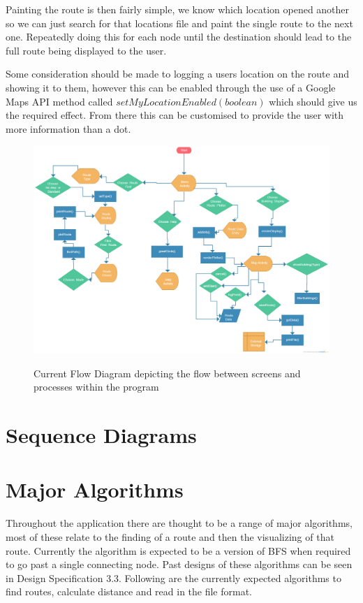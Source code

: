 Painting the route is then fairly simple, we know which location opened another so we can just search for that locations file and paint the single route to the next one. Repeatedly doing this for each node until the destination should lead to the full route being displayed to the user.

Some consideration should be made to logging a users location on  the route and showing it to them, however this can be enabled through the use of a Google Maps API method called $setMyLocationEnabled(boolean)$\cite{setlocation} which should give us the required effect. From there this can be customised to provide the user with more information than a dot. 

\begin{figure}
\includegraphics[scale=0.22]{Chapter2/flowo.png} \\
\caption[Flow Diagram]{Current Flow Diagram depicting the flow between screens and processes within the program}
\end{figure}
\newpage
\section{Sequence Diagrams}
\section{Major Algorithms}
Throughout the application there are thought to be a range of major algorithms, most of these relate to the finding of a route and then the visualizing of that route. Currently the algorithm is expected to be a version of BFS when required to go past a single connecting node. Past designs of these algorithms can be seen in Design Specification 3.3. Following are the currently expected algorithms to find routes, calculate distance and read in the file format.

